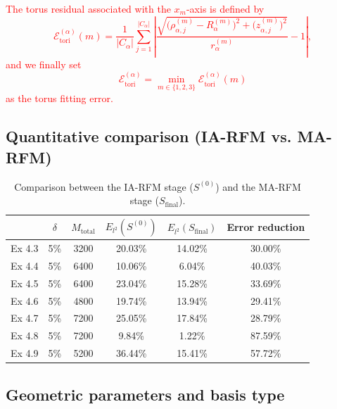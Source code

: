 \documentclass{article}
\newcommand{\red}[1]{\textcolor{red}{#1}}
\theoremstyle{plain}
\theoremstyle{definition}
\begin{document}
{  \red{The torus residual associated with the \(x_m\)-axis is defined by
  \[
  \mathcal{E}_{\mathrm{tori}}^{(\alpha)}(m)
  =
  \frac{1}{|C_\alpha|}
  \sum_{j=1}^{|C_\alpha|}
  \left|
  \frac{\sqrt{\bigl(\rho_{\alpha,j}^{(m)}-R_\alpha^{(m)}\bigr)^2+\bigl(z_{\alpha,j}^{(m)}\bigr)^2}}
  {r_\alpha^{(m)}}-1
  \right|,
  \]
  and we finally set
  \[
  \mathcal{E}_{\mathrm{tori}}^{(\alpha)}
  =
  \min_{m\in\{1,2,3\}}
  \mathcal{E}_{\mathrm{tori}}^{(\alpha)}(m)
  \]
  as the torus fitting error.}

\subsection{Quantitative comparison (IA-RFM vs. MA-RFM)}
  \begin{table}[H]
      \centering
      \color{red}
      \caption{Comparison between the IA-RFM stage ($S^{(0)}$) and the MA-RFM stage ($S_{\text{final}}$).}
      \begin{tabular}{cccccc}
          \toprule
           & $\delta$ & $M_{\text{total}}$ & $E_{l^2}(S^{(0)})$ & $E_{l^2}(S_{\text{final}})$ & Error reduction \\
          \midrule
          Ex 4.3 & 5\% & 3200 & 20.03\% & 14.02\% & 30.00\% \\
          Ex 4.4 & 5\% & 6400 & 10.06\% & 6.04\% & 40.03\% \\
          Ex 4.5 & 5\% & 6400 & 23.04\% & 15.28\% & 33.69\% \\
          Ex 4.6 & 5\% & 4800 & 19.74\% & 13.94\% & 29.41\% \\
          Ex 4.7 & 5\% & 7200 & 25.05\% & 17.84\% & 28.79\% \\
          Ex 4.8 & 5\% & 7200 & 9.84\% & 1.22\% & 87.59\% \\
          Ex 4.9 & 5\% & 5200 & 36.44\% & 15.41\% & 57.72\% \\
          \bottomrule
      \end{tabular}
      \label{tab:Comparison of IA-RFM and MA-RFM}
  \end{table}

\subsection{Geometric parameters and basis type}
\begin{table}[H]
\color{red}
      \centering
      \caption{Extracted geometric parameters and statistical indicators with $\delta=5\%$ by Algorithm \ref{alg: shape_detection}.}
      \label{tab:extracted_parameters}
\end{table}}
\end{document}
